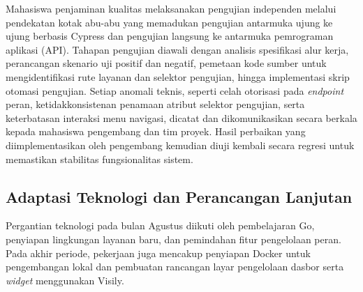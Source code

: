 Mahasiswa penjaminan kualitas melaksanakan pengujian independen melalui pendekatan kotak abu-abu yang memadukan pengujian antarmuka ujung ke ujung berbasis Cypress dan pengujian langsung ke antarmuka pemrograman aplikasi (API). Tahapan pengujian diawali dengan analisis spesifikasi alur kerja, perancangan skenario uji positif dan negatif, pemetaan kode sumber untuk mengidentifikasi rute layanan dan selektor pengujian, hingga implementasi skrip otomasi pengujian. Setiap anomali teknis, seperti celah otorisasi pada \textit{endpoint} peran, ketidakkonsistenan penamaan atribut selektor pengujian, serta keterbatasan interaksi menu navigasi, dicatat dan dikomunikasikan secara berkala kepada mahasiswa pengembang dan tim proyek. Hasil perbaikan yang diimplementasikan oleh pengembang kemudian diuji kembali secara regresi untuk memastikan stabilitas fungsionalitas sistem.

\subsection{Adaptasi Teknologi dan Perancangan Lanjutan}
Pergantian teknologi pada bulan Agustus diikuti oleh pembelajaran Go, penyiapan lingkungan layanan baru, dan pemindahan fitur pengelolaan peran. Pada akhir periode, pekerjaan juga mencakup penyiapan Docker untuk pengembangan lokal dan pembuatan rancangan layar pengelolaan dasbor serta \textit{widget} menggunakan Visily.

